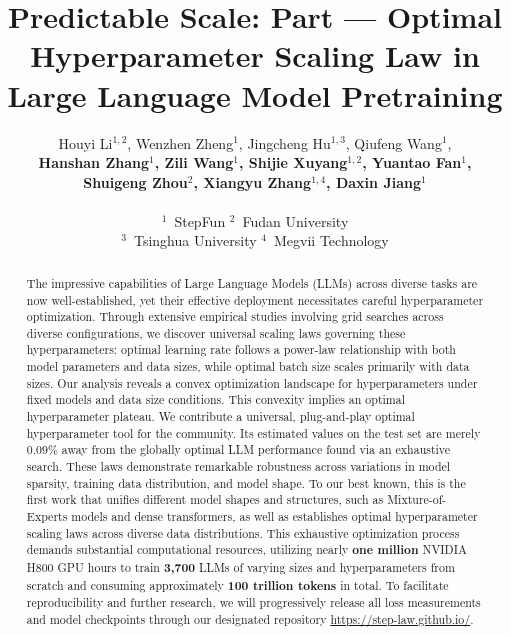 \documentclass[11pt]{article}
\title{Predictable Scale: Part \uppercase\expandafter{\romannumeral 1} —
Optimal Hyperparameter Scaling Law in Large Language Model Pretraining}
\author{
Houyi Li$^{1,2}$,
Wenzhen Zheng$^{1}$,
Jingcheng Hu$^{1,3}$,
Qiufeng Wang$^{1}$,
\\
\textbf{Hanshan Zhang$^{1}$,
Zili Wang$^{1}$,
Shijie Xuyang$^{1,2}$,
Yuantao Fan$^{1}$,}
\\
\textbf{Shuigeng Zhou$^{2}$,
Xiangyu Zhang$^{1,4}$,
Daxin Jiang$^{1}$}
\\\\
$^1$~StepFun \qquad
$^2$~Fudan University \qquad
\\$^3$~Tsinghua University
 $^4$~Megvii Technology
}
\begin{document}
    \maketitle

    \begin{abstract}
    The impressive capabilities of Large Language Models (LLMs) across diverse tasks are now well-established, yet their effective deployment necessitates careful hyperparameter optimization.
    Through extensive empirical studies involving grid searches across diverse configurations, we discover universal scaling laws
    governing these hyperparameters: optimal learning rate follows a power-law relationship with both model parameters and data sizes, while optimal batch
    size scales primarily with data sizes. 
    Our analysis reveals a convex optimization landscape for hyperparameters under fixed models and data size conditions.  
    This convexity implies an optimal hyperparameter plateau. We contribute a universal, plug-and-play optimal hyperparameter tool for the community. Its estimated values on the test set are merely 0.09\% away from the globally optimal LLM performance found via an exhaustive search.  
    These laws demonstrate remarkable robustness across variations in model sparsity, training data distribution, and model shape. To our best known, this is the first work that unifies different model shapes and structures, such as Mixture-of-Experts models and dense transformers, as well as establishes optimal hyperparameter scaling laws across diverse data distributions. This exhaustive optimization process demands substantial computational resources, utilizing nearly \textbf{one million} NVIDIA H800 GPU hours to train \textbf{3,700} LLMs of varying sizes and hyperparameters from scratch and consuming approximately \textbf{100 trillion tokens} in total. To facilitate reproducibility and further research, we will progressively release all loss measurements and model checkpoints through our designated repository \href{https://step-law.github.io/}{https://step-law.github.io/}. 
    \end{abstract}
\end{document}
